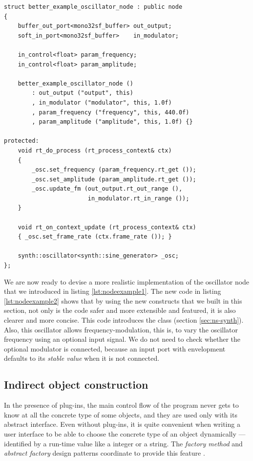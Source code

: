 \begin{lstlisting}[float=h!,caption=The oscillator node implemented
  using components,label=lst:nodeexample2]
struct better_example_oscillator_node : public node
{
    buffer_out_port<mono32sf_buffer> out_output;
    soft_in_port<mono32sf_buffer>    in_modulator;
    
    in_control<float> param_frequency;
    in_control<float> param_amplitude;

    better_example_oscillator_node ()
        : out_output ("output", this)
        , in_modulator ("modulator", this, 1.0f)
        , param_frequency ("frequency", this, 440.0f)
        , param_amplitude ("amplitude", this, 1.0f) {}

protected:
    void rt_do_process (rt_process_context& ctx)
    {
        _osc.set_frequency (param_frequency.rt_get ());
        _osc.set_amplitude (param_amplitude.rt_get ());
        _osc.update_fm (out_output.rt_out_range (),
                        in_modulator.rt_in_range ());
    }

    void rt_on_context_update (rt_process_context& ctx)
    { _osc.set_frame_rate (ctx.frame_rate ()); }

    synth::oscillator<synth::sine_generator> _osc;
};
\end{lstlisting}

We are now ready to devise a more realistic implementation of the
oscillator node that we introduced in listing
\ref{lst:nodeexample1}. The new code in listing \ref{lst:nodeexample2}
shows that by using the new constructs that we built in this section,
not only is the code safer and more extensible and featured, it is
also clearer and more concise. This code introduces the
 class (section \ref{sec:ns-synth}). Also,
this oscillator allows frequency-modulation, this is, to vary the
oscillator frequency using an optional input signal. We do not need to
check whether the optional modulator is connected, because an input
port with envelopment defaults to its \emph{stable value} when it is
not connected.

\subsection{Indirect object construction}
\label{sec:graphfactory}

In the presence of plug-ins, the main control flow of the program
never gets to know at all the concrete type of some objects, and they
are used only with its abstract interface. Even without plug-ins, it
is quite convenient when writing a user interface to be able to choose
the concrete type of an object dynamically --- identified by a
run-time value like a integer or a string. The \emph{factory method}
and \emph{abstract factory} design patterns coordinate to provide this
feature \cite{gamma95design, vlissides98pattern}.

